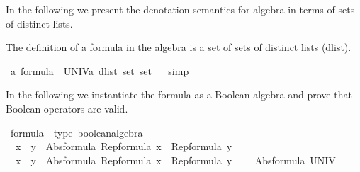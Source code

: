 %
\begin{isabellebody}%
%
%
\isamarkuptrue%
%
\begin{isamarkuptext}%
\label{sec:theory-algebra-dlist}
In the following we present the denotation semantics for \ac{algebra} in terms of sets of distinct lists.%
\end{isamarkuptext}\isamarkuptrue%
%
\isadelimtheory
%
\endisadelimtheory
%
\isatagtheory
%
\endisatagtheory
{\isafoldtheory}%
%
\isadelimtheory
%
\endisadelimtheory
%
\isamarkuptrue%
%
\begin{isamarkuptext}%
The definition of a formula in the \ac{algebra} is a set of sets of distinct lists (dlist).%
\end{isamarkuptext}\isamarkuptrue%
\isamarkupfalse%
\ {\isacharprime}a\ formula\ {\isacharequal}\ {\isachardoublequoteopen}UNIV{\isacharcolon}{\isacharcolon}{\isacharprime}a\ dlist\ set\ set{\isachardoublequoteclose}%
\isadelimproof
\ %
\endisadelimproof
%
\isatagproof
{}\isamarkupfalse%
\ simp%
\endisatagproof
{\isafoldproof}%
%
\isadelimproof
%
\endisadelimproof
%
\isamarkuptrue%
%
\begin{isamarkuptext}%
In the following we instantiate the formula as a Boolean algebra and prove that Boolean operators are valid.%
\end{isamarkuptext}\isamarkuptrue%
\isamarkupfalse%
\ formula\ {\isacharcolon}{\isacharcolon}\ {\isacharparenleft}type{\isacharparenright}\ boolean{\isacharunderscore}algebra\isanewline
{}\isanewline
\isanewline
{}\isamarkupfalse%
\isanewline
\ \ {\isachardoublequoteopen}x\ {\isasymsqinter}\ y\ {\isacharequal}\ Abs{\isacharunderscore}formula\ {\isacharparenleft}Rep{\isacharunderscore}formula\ x\ {\isasyminter}\ Rep{\isacharunderscore}formula\ y{\isacharparenright}{\isachardoublequoteclose}\isanewline
\isanewline
{}\isamarkupfalse%
\isanewline
\ \ {\isachardoublequoteopen}x\ {\isasymsqunion}\ y\ {\isacharequal}\ Abs{\isacharunderscore}formula\ {\isacharparenleft}Rep{\isacharunderscore}formula\ x\ {\isasymunion}\ Rep{\isacharunderscore}formula\ y{\isacharparenright}{\isachardoublequoteclose}\isanewline
\isanewline
{}\isamarkupfalse%
\isanewline
\ \ {\isachardoublequoteopen}{\isasymtop}\ {\isacharequal}\ Abs{\isacharunderscore}formula\ UNIV{\isachardoublequoteclose}\isanewline

\end{isabellebody}
